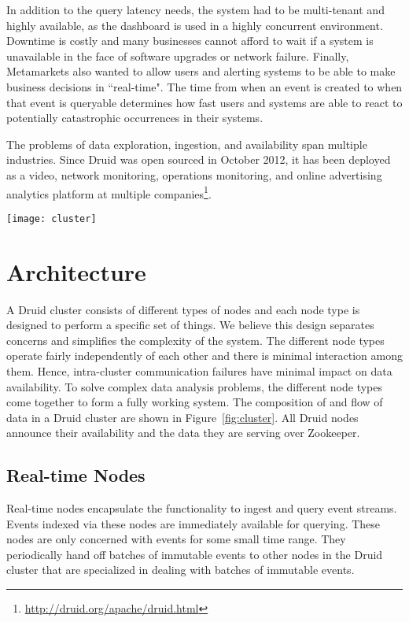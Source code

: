 \documentclass{vldb}
\begin{document}
In addition to the query latency needs, the system had to be multi-tenant and
highly available, as the dashboard is used in a highly concurrent environment.
Downtime is costly and many businesses cannot afford to wait if a system is
unavailable in the face of software upgrades or network failure. Finally,
Metamarkets also wanted to allow users and alerting systems to be able to make
business decisions in ``real-time". The time from when an event is created to
when that event is queryable determines how fast users and systems are able to
react to potentially catastrophic occurrences in their systems. 

The problems of data exploration, ingestion, and availability span multiple
industries. Since Druid was open sourced in October 2012, it has been deployed as a
video, network monitoring, operations monitoring, and online advertising
analytics platform at multiple companies\footnote{\href{http://druid.org/apache/druid.html}{http://druid.org/apache/druid.html}}.

\begin{figure*}
\centering
\texttt{[image: cluster]}
\caption{An overview of a Druid cluster and the flow of data through the cluster.}
\label{fig:cluster}
\end{figure*}

\section{Architecture}
A Druid cluster consists of different types of nodes and each node type is
designed to perform a specific set of things. We believe this design separates
concerns and simplifies the complexity of the system. The different node types
operate fairly independently of each other and there is minimal interaction among
them. Hence, intra-cluster communication failures have minimal impact on data
availability.  To solve complex data analysis problems, the different node
types come together to form a fully working system. The composition of and flow
of data in a Druid cluster are shown in Figure~\ref{fig:cluster}. All Druid
nodes announce their availability and the data they are serving over
Zookeeper\cite{hunt2010zookeeper}.

\subsection{Real-time Nodes}
Real-time nodes encapsulate the functionality to ingest and query event
streams. Events indexed via these nodes are immediately available for querying.
These nodes are only concerned with events for some small time range. They
periodically hand off batches of immutable events to other nodes in the Druid
cluster that are specialized in dealing with batches of immutable events.
\end{document}
